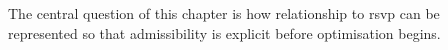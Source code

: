 The central question of this chapter is how relationship to rsvp can be represented so that admissibility is explicit before optimisation begins.
